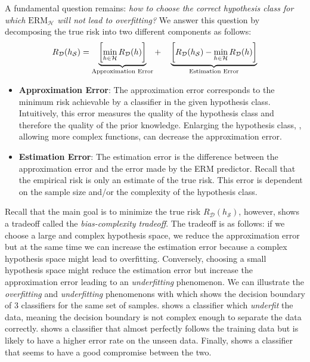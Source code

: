 A fundamental question remains: \emph{how to choose the correct hypothesis class for which $\text{ERM}_\mathcal{H}$ will not lead to overfitting?} 
We answer this question by decomposing the true risk into two different components as follows: 
\begin{equation} \label{equation:ch2-bias_complexity_tradeoff}
  R_\mathcal{D} (h_\mathcal{S}) = 
  \underbrace{\left[ \min_{h \in \mathcal{H}} R_\mathcal{D}(h) \right]}_{\text{\scriptsize Approximation Error}} + \quad 
  \underbrace{\left[ R_\mathcal{D}(h_\mathcal{S}) - \min_{h \in \mathcal{H}} R_\mathcal{D}(h) \right]}_{\text{\scriptsize Estimation Error}} 
\end{equation}
\begin{itemize}
  \item \textbf{Approximation Error}: The approximation error corresponds to the minimum risk achievable by a classifier in the given hypothesis class.
  Intuitively, this error measures the quality of the hypothesis class and therefore the quality of the prior knowledge.
  Enlarging the hypothesis class, \ie, allowing more complex functions, can decrease the approximation error.
  \item \textbf{Estimation Error}: The estimation error is the difference between the approximation error and the error made by the ERM predictor.
  Recall that the empirical risk is only an estimate of the true risk.
  This error is dependent on the sample size and/or the complexity of the hypothesis class. 
\end{itemize}
Recall that the main goal is to minimize the true risk $R_\mathcal{D} (h_\mathcal{S})$, however,  shows a tradeoff called the \emph{bias-complexity tradeoff}.
The tradeoff is as follows: if we choose a large and complex hypothesis space, we reduce the approximation error but at the same time we can increase the estimation error because a complex hypothesis space might lead to overfitting.
Conversely, choosing a small hypothesis space might reduce the estimation error but increase the approximation error leading to an \emph{underfitting} phenomenon.
We can illustrate the \emph{overfitting} and \emph{underfitting} phenomenons with  which shows the decision boundary of 3 classifiers for the same set of samples.
 shows a classifier which \emph{underfit} the data, meaning the decision boundary is not complex enough to separate the data correctly.
 shows a classifier that almost perfectly follows the training data but is likely to have a higher error rate on the unseen data.
Finally,  shows a classifier that seems to have a good compromise between the two.


